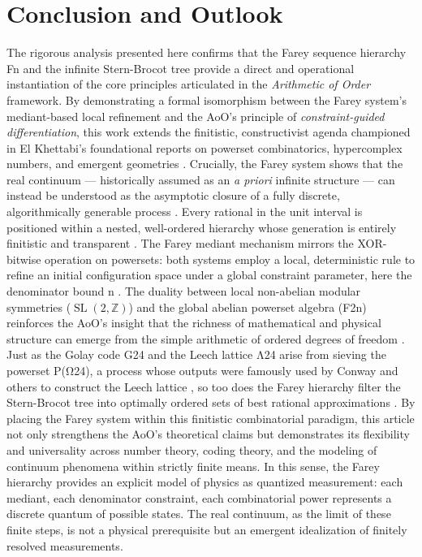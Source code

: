 \documentclass[12pt,a4paper]{article}
\DeclareMathOperator{\SL}{SL}
\theoremstyle{definition}
\theoremstyle{remark}
\begin{document}
\section{Conclusion and Outlook}
The rigorous analysis presented here confirms that the Farey sequence hierarchy Fn​ and the infinite Stern-Brocot tree provide a direct and operational instantiation of the core principles articulated in the \emph{Arithmetic of Order} framework. By demonstrating a formal isomorphism between the Farey system’s mediant-based local refinement and the AoO’s principle of \emph{constraint-guided differentiation}, this work extends the finitistic, constructivist agenda championed in El Khettabi’s foundational reports on powerset combinatorics, hypercomplex numbers, and emergent geometries \cite{ElKhettabi2025AoO, ElKhettabi2024HCN, ElKhettabi2024PLOS}.
Crucially, the Farey system shows that the real continuum --- historically assumed as an \emph{a priori} infinite structure --- can instead be understood as the asymptotic closure of a fully discrete, algorithmically generable process \cite{SEP_Finitism, Zukin2016}. Every rational in the unit interval is positioned within a nested, well-ordered hierarchy whose generation is entirely finitistic and transparent \cite{WikipediaFarey, Zukin2016}. The Farey mediant mechanism mirrors the XOR-bitwise operation on powersets: both systems employ a local, deterministic rule to refine an initial configuration space under a global constraint parameter, here the denominator bound n \cite{WikipediaPowerset, JNSFarey}.
The duality between local non-abelian modular symmetries ($\SL(2,\mathbb{Z})$) and the global abelian powerset algebra (F2n​) reinforces the AoO’s insight that the richness of mathematical and physical structure can emerge from the simple arithmetic of ordered degrees of freedom \cite{ElKhettabi2025AoO, ConradSL2Z, BooleanRing}. Just as the Golay code G24​ and the Leech lattice Λ24​ arise from sieving the powerset P(Ω24​), a process whose outputs were famously used by Conway and others to construct the Leech lattice \cite{ConwaySloane}, so too does the Farey hierarchy filter the Stern-Brocot tree into optimally ordered sets of best rational approximations \cite{DUMMIT}.
By placing the Farey system within this finitistic combinatorial paradigm, this article not only strengthens the AoO’s theoretical claims but demonstrates its flexibility and universality across number theory, coding theory, and the modeling of continuum phenomena within strictly finite means. In this sense, the Farey hierarchy provides an explicit model of physics as quantized measurement: each mediant, each denominator constraint, each combinatorial power represents a discrete quantum of possible states. The real continuum, as the limit of these finite steps, is not a physical prerequisite but an emergent idealization of finitely resolved measurements.
\end{document}
